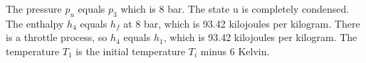 The pressure \( p_u \) equals \( p_3 \) which is 8 bar. The state u is completely condensed. The enthalpy \( h_4 \) equals \( h_f \) at 8 bar, which is 93.42 kilojoules per kilogram. There is a throttle process, so \( h_4 \) equals \( h_1 \), which is 93.42 kilojoules per kilogram. The temperature \( T_1 \) is the initial temperature \( T_i \) minus 6 Kelvin.
